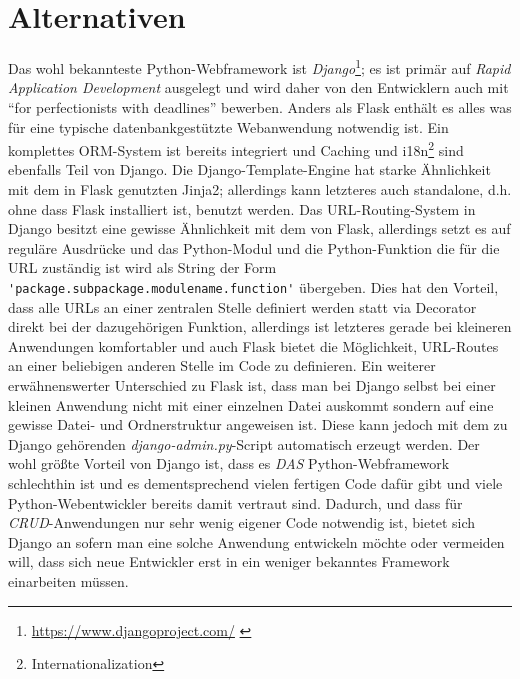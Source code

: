 \section{Alternativen}
Das wohl bekannteste Python-Webframework ist
\emph{Django}\footnote{\href{https://www.djangoproject.com/}{https://www.djangoproject.com/}
\citep{django}}; es
ist primär auf \emph{Rapid Application Development} ausgelegt und wird daher von den Entwicklern
auch mit \enquote{for perfectionists with deadlines} bewerben. Anders als Flask enthält es alles was
für eine typische datenbankgestützte Webanwendung notwendig ist. Ein komplettes ORM-System ist
bereits integriert und Caching und i18n\footnote{Internationalization} sind ebenfalls Teil von
Django. Die Django-Template-Engine hat starke Ähnlichkeit mit dem in Flask genutzten Jinja2;
allerdings kann letzteres auch standalone, d.h. ohne dass Flask installiert ist, benutzt werden. Das
URL-Routing-System in Django besitzt eine gewisse Ähnlichkeit mit dem von Flask, allerdings setzt es
auf reguläre Ausdrücke und das Python-Modul und die Python-Funktion die für die URL zuständig ist
wird als String der Form \lstinline{'package.subpackage.modulename.function'} übergeben. Dies hat
den Vorteil, dass alle URLs an einer zentralen Stelle definiert werden statt via Decorator direkt
bei der dazugehörigen Funktion, allerdings ist letzteres gerade bei kleineren Anwendungen
komfortabler und auch Flask bietet die Möglichkeit, URL-Routes an einer beliebigen anderen Stelle im
Code zu definieren. Ein weiterer erwähnenswerter Unterschied zu Flask ist, dass man bei Django
selbst bei einer kleinen Anwendung nicht mit einer einzelnen Datei auskommt sondern auf eine gewisse
Datei- und Ordnerstruktur angeweisen ist. Diese kann jedoch mit dem zu Django gehörenden
\emph{django-admin.py}-Script automatisch erzeugt werden. Der wohl größte Vorteil von Django ist,
dass es \emph{DAS} Python-Webframework schlechthin ist und es dementsprechend vielen fertigen Code
dafür gibt und viele Python-Webentwickler bereits damit vertraut sind. Dadurch, und dass für
\emph{CRUD}-Anwendungen nur sehr wenig eigener Code notwendig ist, bietet sich Django an sofern man
eine solche Anwendung entwickeln möchte oder vermeiden will, dass sich neue Entwickler erst in ein
weniger bekanntes Framework einarbeiten müssen.

